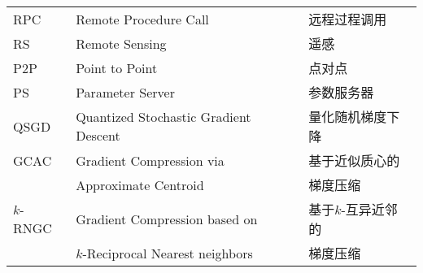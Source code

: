 \begin{center}
{\begin{longtable}{lll}
        RPC & Remote Procedure Call & 远程过程调用 \\
        RS & Remote Sensing & 遥感 \\
        P2P & Point to Point & 点对点 \\
        PS & Parameter Server & 参数服务器 \\
        QSGD & Quantized Stochastic Gradient Descent & 量化随机梯度下降 \\
        GCAC & Gradient Compression via & 基于近似质心的 \\
             & Approximate Centroid & 梯度压缩 \\
        $k$-RNGC & Gradient Compression based on & 基于$k$-互异近邻的 \\
                & $k$-Reciprocal Nearest neighbors & 梯度压缩 \\
    \end{longtable}}
\end{center}
